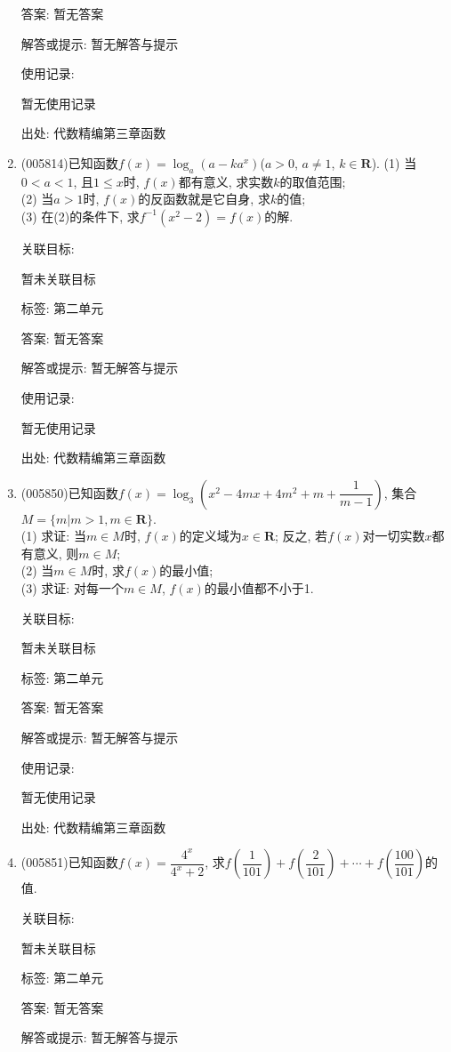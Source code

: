 \documentclass[10pt,a4paper]{article}
\begin{document}
\begin{enumerate}[1.]
答案: 暂无答案

解答或提示: 暂无解答与提示

使用记录:

暂无使用记录


出处: 代数精编第三章函数
\item { (005814)}已知函数$f(x)=\log_a(a-ka^x)$($a>0$, $a\ne 1$, $k\in \mathbf{R}$).
(1) 当$0<a<1$, 且$1\le x$时, $f(x)$都有意义, 求实数$k$的取值范围;\\
(2) 当$a>1$时, $f(x)$的反函数就是它自身, 求$k$的值;\\
(3) 在(2)的条件下, 求$f^{-1}(x^2-2)=f(x)$的解.


关联目标:

暂未关联目标



标签: 第二单元

答案: 暂无答案

解答或提示: 暂无解答与提示

使用记录:

暂无使用记录


出处: 代数精编第三章函数
\item { (005850)}已知函数$f(x)=\log_3(x^2-4mx+4m^2+m+\dfrac 1{m-1})$, 集合$M=\{m|m>1,m\in \mathbf{R}\}$.\\
(1) 求证: 当$m\in M$时, $f(x)$的定义域为$x\in \mathbf{R}$; 反之, 若$f(x)$对一切实数$x$都有意义, 则$m\in M$;\\
(2) 当$m\in M$时, 求$f(x)$的最小值;\\
(3) 求证: 对每一个$m\in M$, $f(x)$的最小值都不小于1.


关联目标:

暂未关联目标



标签: 第二单元

答案: 暂无答案

解答或提示: 暂无解答与提示

使用记录:

暂无使用记录


出处: 代数精编第三章函数
\item { (005851)}已知函数$f(x)=\dfrac{4^x}{4^x+2}$, 求$f(\dfrac 1{101})+f(\dfrac 2{101})+\cdots +f(\dfrac{100}{101})$的值.


关联目标:

暂未关联目标



标签: 第二单元

答案: 暂无答案

解答或提示: 暂无解答与提示


\end{enumerate}
\end{document}
